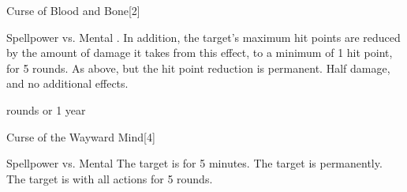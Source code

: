 \begin{spellsection}{Curse of Blood and Bone}[2]
    \begin{spellheader}
    \end{spellheader}
    \begin{spellcontent}
        \begin{spelltargetinginfo}
        \end{spelltargetinginfo}
        \begin{spelleffects}
            \begin{spellattack}{Spellpower vs. Mental}
                \spellsuccess {}. In addition, the target's maximum hit points are reduced by the amount of damage it takes from this effect, to a minimum of 1 hit point, for 5 rounds.
                \spellcritical As above, but the hit point reduction is permanent.
                \spellfailure Half damage, and no additional effects.
            \end{spellattack}
             rounds or 1 year
        \end{spelleffects}
    \end{spellcontent}
    \begin{spellfooter}
        \spellnotes \cursespellnotes
        \miscastrandom
    \end{spellfooter}
\end{spellsection}

\begin{spellsection}{Curse of the Wayward Mind}[4]
    \begin{spellheader}
    \end{spellheader}
    \begin{spellcontent}
        \begin{spelltargetinginfo}
        \end{spelltargetinginfo}
        \begin{spelleffects}
            \begin{spellattack}{Spellpower vs. Mental}
                \spellsuccess The target is \disoriented for 5 minutes.
                \spellcritical The target is \disoriented permanently.
                \spellfailure The target is \impaired with all actions for 5 rounds.
            \end{spellattack}
        \end{spelleffects}
    \end{spellcontent}
    \begin{spellfooter}
        \spellnotes \cursespellnotes
        \miscastrandom
    \end{spellfooter}
\end{spellsection}

